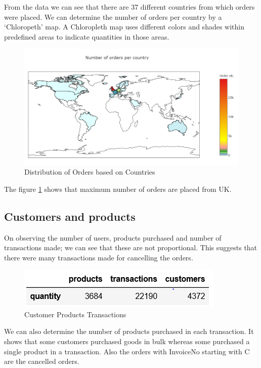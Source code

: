 From the data we can see that there are 37 different countries from which orders were placed. We can determine the number of orders per country by a  `Chloropeth' map. A Chloropleth map uses different colors and shades within predefined areas to indicate quantities in those areas. \\

\begin{figure}[H]
\caption{Distribution of Orders based on Countries}
\label{country}
\centering
\includegraphics[width=\columnwidth]{images/chloropleth.PNG}
\end{figure}

The figure \ref{country} shows that maximum number of orders are placed from UK.

\subsection{Customers and products}

On observing the number of users, products purchased and number of transactions made; we can see that these are not proportional. This suggests that there were many transactions made for cancelling the orders.\\

\begin{figure}[H]
\caption{Customer Products Transactions}
\label{2.1}
\centering
\includegraphics[width=\columnwidth]{images/2_1.PNG}
\end{figure}

We can also determine the number of products purchased in each transaction. It shows that some customers purchased goods in bulk whereas some purchased a single product in a transaction.
Also the orders with InvoiceNo starting with C are the cancelled orders.

